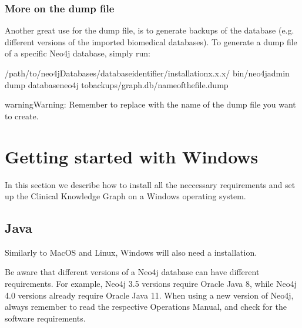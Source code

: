 \documentclass[letterpaper,10pt,english]{sphinxmanual}
\begin{document}
\subsubsection{More on the dump file}
\label{\detokenize{intro/getting-started-with-build:more-on-the-dump-file}}
Another great use for the dump file, is to generate backups of the database (e.g. different versions of the imported biomedical databases).
To generate a dump file of a specific Neo4j database, simply run:

\begin{sphinxVerbatim}[commandchars=\\\{\}]
\PYGZdl{}  /path/to/neo4jDatabases/database\PYGZhy{}identifier/installation\PYGZhy{}x.x.x/
\PYGZdl{} bin/neo4j\PYGZhy{}admin dump \PYGZhy{}\PYGZhy{}databaseneo4j \PYGZhy{}\PYGZhy{}tobackups/graph.db/name\PYGZus{}of\PYGZus{}the\PYGZus{}file.dump
\end{sphinxVerbatim}

\begin{sphinxadmonition}{warning}{Warning:}
Remember to replace  with the name of the dump file you want to create.
\end{sphinxadmonition}


\section{Getting started with Windows}
\label{\detokenize{intro/getting-started-with-windows:getting-started-with-windows}}\label{\detokenize{intro/getting-started-with-windows:windows-installation}}\label{\detokenize{intro/getting-started-with-windows::doc}}
In this section we describe how to install all the neccessary requirements and set up the Clinical Knowledge Graph on a Windows operating system.


\subsection{Java}
\label{\detokenize{intro/getting-started-with-windows:java}}
Similarly to MacOS and Linux, Windows will also need a  installation.

Be aware that different versions of a Neo4j database can have different requirements. For example, Neo4j 3.5 versions require Oracle Java 8, while Neo4j 4.0 versions already require Oracle Java 11.
When using a new version of Neo4j, always remember to read the respective Operations Manual, and check for the software requirements.
\end{document}
